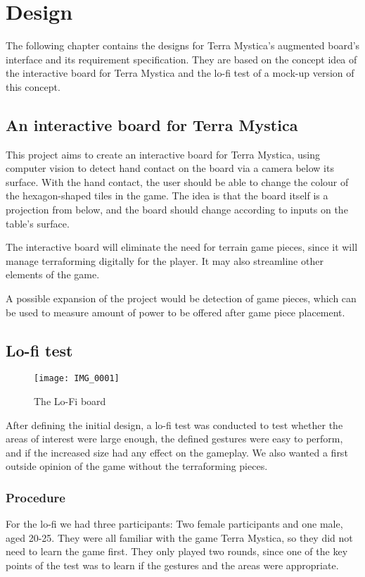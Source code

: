 \chapter{Design}\label{ch:design}
The following chapter contains the designs for Terra Mystica's augmented board's interface and its requirement specification. They are based on the concept idea of the interactive board for Terra Mystica and the lo-fi test of a mock-up version of this concept.

\section{An interactive board for Terra Mystica}
This project aims to create an interactive board for Terra Mystica, using computer vision to detect hand contact on the board via a camera below its surface. With the hand contact, the user should be able to change the colour of the hexagon-shaped tiles in the game. The idea is that the board itself is a projection from below, and the board should change according to inputs on the table's surface.

The interactive board will eliminate the need for terrain game pieces, since it will manage terraforming digitally for the player. It may also streamline other elements of the game.

A possible expansion of the project would be detection of game pieces, which can be used to measure amount of power to be offered after game piece placement.

\section{Lo-fi test}
\begin{figure}
\centering
\texttt{[image: IMG\_0001]}
\caption{The Lo-Fi board}
\end{figure}

After defining the initial design, a lo-fi test was conducted to test whether the areas of interest were large enough, the defined gestures were easy to perform, and if the increased size had any effect on the gameplay. We also wanted a first outside opinion of the game without the terraforming pieces.

\subsection{Procedure}
For the lo-fi we had three participants: Two female participants and one male, aged 20-25. 
They were all familiar with the game Terra Mystica, so they did not need to learn the game first. They only played two rounds, since one of the key points of the test was to learn if the gestures and the areas were appropriate. 


